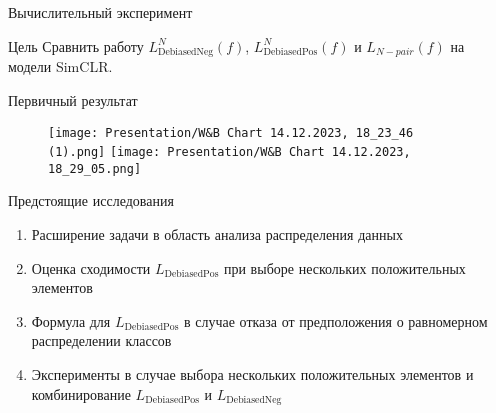 \documentclass{beamer}
\begin{document}
\begin{frame}{Вычислительный эксперимент}
\begin{block}{Цель}
Сравнить работу $L_{\text{DebiasedNeg}}^N(f)$, $L_{\text{DebiasedPos}}^N(f)$ и $L_{N-pair}(f)$ на модели SimCLR.
\end{block}

\begin{block}{Первичный результат}
\begin{figure}
   \texttt{[image: Presentation/W\&B Chart 14.12.2023, 18\_23\_46 (1).png]}
   \hfill
   \texttt{[image: Presentation/W\&B Chart 14.12.2023, 18\_29\_05.png]}
\end{figure}
\end{block}

\end{frame}
\begin{frame}{Предстоящие исследования} 
\begin{enumerate}
    \item Расширение задачи в область анализа распределения данных
    \item Оценка сходимости $L_{\text{DebiasedPos}}$ при выборе нескольких положительных элементов
    \item Формула для $L_{\text{DebiasedPos}}$ в случае отказа от предположения о равномерном распределении классов
    \item Эксперименты в случае выбора нескольких положительных элементов и комбинирование $L_{\text{DebiasedPos}}$ и $L_{\text{DebiasedNeg}}$
\end{enumerate}
\end{frame}
\end{document}
